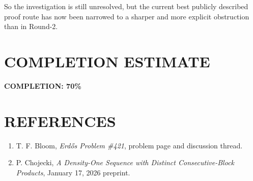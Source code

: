 So the investigation is still unresolved, but the current best publicly described proof route has now been narrowed to a sharper and more explicit obstruction than in Round-2.

\section{COMPLETION ESTIMATE}

\noindent \textbf{COMPLETION: 70\%}

\section{REFERENCES}

\begin{enumerate}
\item T. F. Bloom, \emph{Erd\H{o}s Problem \#421}, problem page and discussion thread.
\item P. Chojecki, \emph{A Density-One Sequence with Distinct Consecutive-Block Products}, January 17, 2026 preprint.
\end{enumerate}

